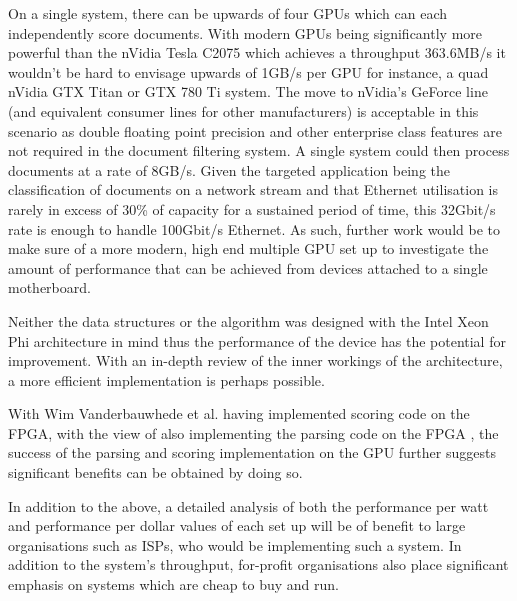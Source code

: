 On a single system, there can be upwards of four GPUs which can each
independently score documents. With modern GPUs being significantly more
powerful than the nVidia Tesla C2075 which achieves a throughput 363.6MB/s it
wouldn't be hard to envisage upwards of 1GB/s per GPU for instance, a quad
nVidia GTX Titan or GTX 780 Ti system. The move to nVidia's GeForce line (and
equivalent consumer lines for other manufacturers) is acceptable in this
scenario as double floating point precision and other enterprise class features
are not required in the document filtering system. A single system could then
process documents at a rate of 8GB/s. Given the targeted application being the
classification of documents on a network stream and that Ethernet utilisation is
rarely in excess of 30\% of capacity for a sustained period of time, this
32Gbit/s rate is enough to handle 100Gbit/s Ethernet. As such, further work
would be to make sure of a more modern, high end multiple GPU set up to
investigate the amount of performance that can be achieved from devices attached
to a single motherboard.

Neither the data structures or the algorithm was designed with the Intel Xeon
Phi architecture in mind thus the performance of the device has the potential
for improvement. With an in-depth review of the inner workings of the
architecture, a more efficient implementation is perhaps possible.

With Wim Vanderbauwhede et al. having implemented scoring code on the FPGA, with
the view of also implementing the parsing code on the FPGA \cite{HybridCPUFPGA},
the success of the parsing and scoring implementation on the GPU further
suggests significant benefits can be obtained by doing so.

In addition to the above, a detailed analysis of both the performance per watt
and performance per dollar values of each set up will be of benefit to large
organisations such as ISPs, who would be implementing such a system. In addition
to the system's throughput, for-profit organisations also place significant
emphasis on systems which are cheap to buy and run.
